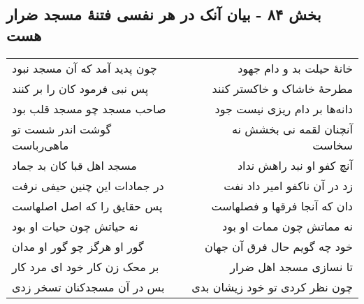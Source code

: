 \begin{center}
\section*{بخش ۸۴ - بیان آنک در هر نفسی فتنهٔ مسجد ضرار هست}
\label{sec:sh084}
\begin{longtable}{l p{0.5cm} r}
چون پدید آمد که آن مسجد نبود
&&
خانهٔ حیلت بد و دام جهود
\\
پس نبی فرمود کان را بر کنند
&&
مطرحهٔ خاشاک و خاکستر کنند
\\
صاحب مسجد چو مسجد قلب بود
&&
دانه‌ها بر دام ریزی نیست جود
\\
گوشت اندر شست تو ماهی‌رباست
&&
آنچنان لقمه نی بخشش نه سخاست
\\
مسجد اهل قبا کان بد جماد
&&
آنچ کفو او نبد راهش نداد
\\
در جمادات این چنین حیفی نرفت
&&
زد در آن ناکفو امیر داد نفت
\\
پس حقایق را که اصل اصلهاست
&&
دان که آنجا فرقها و فصلهاست
\\
نه حیاتش چون حیات او بود
&&
نه مماتش چون ممات او بود
\\
گور او هرگز چو گور او مدان
&&
خود چه گویم حال فرق آن جهان
\\
بر محک زن کار خود ای مرد کار
&&
تا نسازی مسجد اهل ضرار
\\
بس در آن مسجدکنان تسخر زدی
&&
چون نظر کردی تو خود زیشان بدی
\\
\end{longtable}
\end{center}
